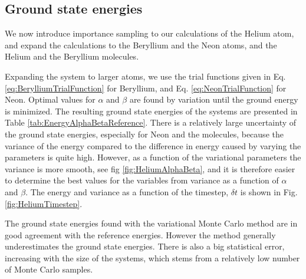 	\subsection{Ground state energies}
		We now introduce importance sampling to our calculations of the Helium atom, and expand the calculations to the Beryllium and the Neon atoms, and the Helium and the Beryllium molecules. 

		Expanding the system to larger atoms, we use the trial functions given in Eq. \eqref{eq:BerylliumTrialFunction} for Beryllium, and Eq. \eqref{eq:NeonTrialFunction} for Neon. Optimal values for $\alpha$ and $\beta$ are found by variation until the ground energy is minimized. The resulting ground state energies of the systems are presented in Table \ref{tab:EnergyAlphaBetaReference}. There is a relatively large uncertainty of the ground state energies, especially for Neon and the molecules, because the variance of the energy compared to the difference in energy caused by varying the parameters is quite high. However, as a function of the variational parameters the variance is more smooth, see fig \ref{fig:HeliumAlphaBeta}, and it is therefore easier to determine the best values for the variables from variance as a function of \(\alpha\) and \(\beta\). The energy and variance as a function of the timestep, $\delta t$ is shown in Fig. \ref{fig:HeliumTimestep}. 

		The ground state energies found with the variational Monte Carlo method are in good agreement with the reference energies. However the method generally underestimates the ground state energies. There is also a big statistical error, increasing with the size of the systems, which stems from a relatively low number of Monte Carlo samples. 



